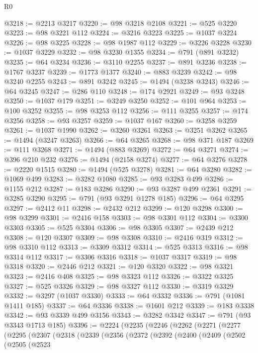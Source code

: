 \begin{lexlean}{R0}
\begin{coremodule}
@3218 := @2213 @3217
@3220 := @98 @3218 @2108
@3221 := @525 @3220
@3223 := @98 @3221 @112
@3224 := @3216 @3223
@3225 := @1037 @3224
@3226 := @98 @3225
@3228 := @98 @1987 @112
@3229 := @3226 @3228
@3230 := @1037 @3229
@3232 := @98 @3230 @1355
@3234 := @791 (@891 @3232)
@3235 := @64 @3234
@3236 := @3110 @2255
@3237 := @891 @3236
@3238 := @1767 @3237
@3239 := @1773 @1377
@3240 := @883 @3239
@3242 := @98 @3240 @2255
@3243 := @891 @3242
@3245 := @1494 (@3238 @3243)
@3246 := @64 @3245
@3247 := @286 @110
@3248 := @174 @2921
@3249 := @93 @3248
@3250 := @1037 @179
@3251 := @3249 @3250
@3252 := @101 @964
@3253 := @100 @3252
@3255 := @98 @3253 @112
@3256 := @111 @3255
@3257 := @174 @3256
@3258 := @93 @3257
@3259 := @1037 @167
@3260 := @3258 @3259
@3261 := @1037 @1990
@3262 := @3260 @3261
@3263 := @3251 @3262
@3265 := @1494 (@3247 @3263)
@3266 := @64 @3265
@3268 := @98 @371 @187
@3269 := @111 @3268
@3271 := @1494 (@883 @3269)
@3272 := @64 @3271
@3274 := @396 @210 @232
@3276 := @1494 (@2158 @3274)
@3277 := @64 @3276
@3278 := @2220 @1515
@3280 := @1494 (@525 @3278)
@3281 := @64 @3280
@3282 := @1069 @499
@3283 := @3282 @1080
@3285 := @93 @3283 @499
@3286 := @1155 @212
@3287 := @183 @3286
@3290 := @93 @3287 @499 @2361
@3291 := @3285 @3290
@3295 := @791 (@93 @3291 @1278 @185)
@3296 := @64 @3295
@3297 := @2412 @11
@3298 := @2432 @212
@3299 := @120 @3298
@3300 := @98 @3299
@3301 := @2416 @158
@3303 := @98 @3301 @112
@3304 := @3300 @3303
@3305 := @525 @3304
@3306 := @98 @3305
@3307 := @2439 @212
@3308 := @120 @3307
@3309 := @98 @3308
@3310 := @2416 @319
@3312 := @98 @3310 @112
@3313 := @3309 @3312
@3314 := @525 @3313
@3316 := @98 @3314 @112
@3317 := @3306 @3316
@3318 := @1037 @3317
@3319 := @98 @3318
@3320 := @2446 @212
@3321 := @120 @3320
@3322 := @98 @3321
@3323 := @2416 @408
@3325 := @98 @3323 @112
@3326 := @3322 @3325
@3327 := @525 @3326
@3329 := @98 @3327 @112
@3330 := @3319 @3329
@3332 := @3297 (@1037 @3330)
@3333 := @64 @3332
@3336 := @791 (@1081 @1411 @185)
@3337 := @64 @3336
@3338 := @1601 @212
@3339 := @183 @3338
@3342 := @93 @3339 @499 @3156
@3343 := @3282 @3342
@3347 := @791 (@93 @3343 @1713 @185)
@3396 := @2224
    (@2235
      (@2246
        (@2262
          (@2271
            (@2277
              (@2295
                (@2307
                  (@2318
                    (@2339
                      (@2356
                        (@2372
                          (@2392
                            (@2400
                              (@2409
                                (@2502
                                  (@2505
                                    (@2523

\end{coremodule}
\end{lexlean}
